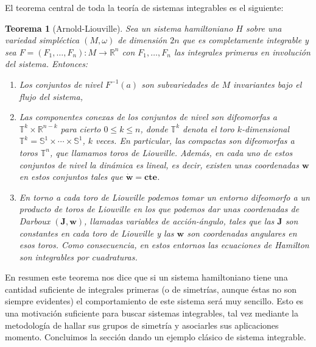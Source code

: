 \documentclass[12pt,a4paper,twoside]{article}
\newtheorem{thm}{Teorema}[section]
\theoremstyle{definition} \newtheorem{defn}[thm]{Definición}
\theoremstyle{definition} \newtheorem{ejemplo}[thm]{Ejemplo}
\theoremstyle{definition} \newtheorem{ejercicio}[thm]{Ejercicio}
\theoremstyle{remark} \newtheorem*{obs}{Observación}
\def\RR{\mathbb{R}}
\def\TT{\mathbb{T}}
\def\SF{\mathbb{S}}
\newcommand{\vect}[1]{\mathbf{#1}}
\begin{document}
  El teorema central de toda la teoría de sistemas integrables es el siguiente:
  \begin{thm}[Arnold-Liouville]\label{arnoldliouville}
   Sea un sistema hamiltoniano $H$ sobre una variedad simpléctica $(M,\omega)$ de dimensión $2n$ que es completamente integrable y sea $F=(F_1,\dots,F_n):M\rightarrow \RR^n$ con $F_1,\dots,F_n$ las integrales primeras en involución del sistema. Entonces:
   \begin{enumerate}
     \item Los conjuntos de nivel $F^{-1}(a)$ son subvariedades de $M$ invariantes bajo el flujo del sistema,
     \item Las componentes conexas de los conjuntos de nivel son difeomorfas a $\TT^k\times \RR^{n-k}$ para cierto $0\leq k \leq n$, donde $\TT^k$ denota el toro $k$-dimensional $\TT^k=\SF^1\times \cdots \times \SF^1$, $k$ veces. En particular, las compactas son difeomorfas a toros $\TT^n$, que llamamos \emph{toros de Liouville}. Además, en cada uno de estos conjuntos de nivel la dinámica es lineal, es decir, existen unas coordenadas $\vect{w}$ en estos conjuntos tales que $\dot{\vect{w}}=\mathbf{cte}$.
     \item En torno a cada toro de Liouville podemos tomar un entorno difeomorfo a un producto de toros de Liouville en los que podemos dar unas coordenadas de Darboux $(\vect{J},\vect{w})$, llamadas \emph{variables de acción-ángulo}, tales que las $\vect{J}$ son constantes en cada toro de Liouville y las $\vect{w}$ son coordenadas angulares en esos toros. Como consecuencia, en estos entornos las ecuaciones de Hamilton son integrables por cuadraturas.
   \end{enumerate}
  \end{thm}
  En resumen este teorema nos dice que si un sistema hamiltoniano tiene una cantidad suficiente de integrales primeras (o de simetrías, aunque éstas no son siempre evidentes) el comportamiento de este sistema será muy sencillo. Esto es una motivación suficiente para buscar sistemas integrables, tal vez mediante la metodología de hallar sus grupos de simetría y asociarles sus aplicaciones momento. Concluimos la sección dando un ejemplo clásico de sistema integrable.
\end{document}
